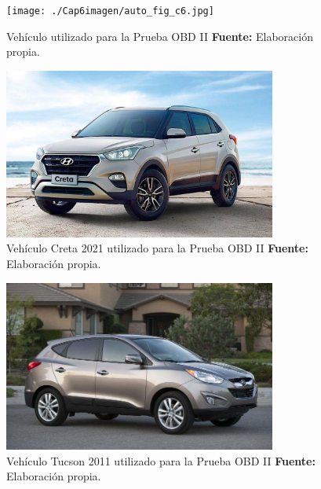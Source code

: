\begin{figure}[H]
	\centering
	\texttt{[image: ./Cap6imagen/auto\_fig\_c6.jpg]}
	\caption [Vehículo utilizado para la Prueba OBD II.]{Vehículo utilizado para la Prueba OBD II \textbf{ Fuente:} %
		Elaboración propia.}
	\label{auto_ref_c6} %
\end{figure}

\begin{figure}[H]
	\centering
	\includegraphics[width=0.8\textwidth]{./Cap6imagen/creta_fig_c6.jpg}
	\caption [Vehículo Creta 2021 utilizado para la Prueba OBD II.]{Vehículo Creta 2021 utilizado para la Prueba OBD II \textbf{ Fuente:} %
		Elaboración propia.}
	\label{creta_ref_c6} %
\end{figure}

\begin{figure}[H]
	\centering
	\includegraphics[width=0.8\textwidth]{./Cap6imagen/tucson_fig_c6.jpg}
	\caption [Vehículo Tucson 2011 utilizado para la Prueba OBD II.]{Vehículo Tucson 2011 utilizado para la Prueba OBD II \textbf{ Fuente:} %
		Elaboración propia.}
	\label{tucson_ref_c6} %
\end{figure}

